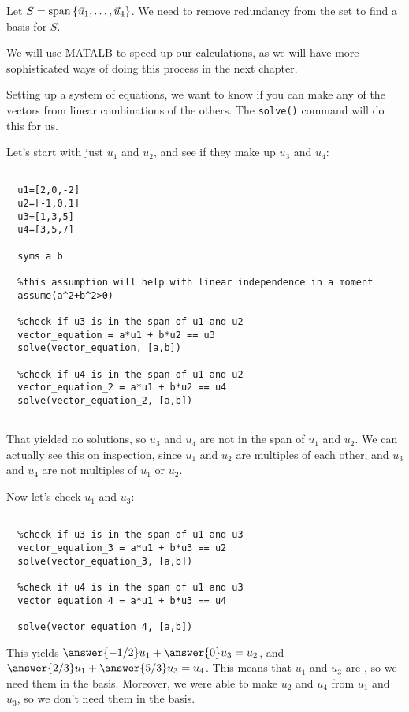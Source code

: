 \documentclass{ximera}
\begin{document}
\begin{solution}
  Let $S=\text{span}\left\{\vec{u}_1,\ldots,\vec{u}_4\right\}$. We need to remove redundancy from the set to find a basis for $S$.

  We will use MATALB to speed up our calculations, as we will have more sophisticated ways of doing this process in the next chapter.

  Setting up a system of equations, we want to know if you can make any of the vectors from linear combinations of the others. The \texttt{solve()} command will do this for us.

  Let's start with just $u_1$ and $u_2$, and see if they make up $u_3$ and $u_4$:

  \begin{verbatim}
  
  u1=[2,0,-2]
  u2=[-1,0,1]
  u3=[1,3,5]
  u4=[3,5,7]

  syms a b

  %this assumption will help with linear independence in a moment
  assume(a^2+b^2>0)

  %check if u3 is in the span of u1 and u2
  vector_equation = a*u1 + b*u2 == u3
  solve(vector_equation, [a,b])

  %check if u4 is in the span of u1 and u2
  vector_equation_2 = a*u1 + b*u2 == u4
  solve(vector_equation_2, [a,b])
  

  \end{verbatim}

  That yielded no solutions, so $u_3$ and $u_4$ are not in the span of $u_1$ and $u_2$. We can actually see this on inspection, since $u_1$ and $u_2$ are multiples of each other, and $u_3$ and $u_4$ are not multiples of $u_1$ or $u_2$.

  Now let's check $u_1$ and $u_3$:

  \begin{verbatim}

  %check if u3 is in the span of u1 and u3
  vector_equation_3 = a*u1 + b*u3 == u2
  solve(vector_equation_3, [a,b])

  %check if u4 is in the span of u1 and u3
  vector_equation_4 = a*u1 + b*u3 == u4

  solve(vector_equation_4, [a,b])

  \end{verbatim}

  This yields $\answer{-1/2} u_1 + \answer{0} u_3 = u_2$, and $\answer{2/3} u_1 + \answer{5/3} u_3 = u_4$. This means that $u_1$ and $u_3$ are , so we need them in the basis. Moreover, we were able to make $u_2$ and $u_4$ from $u_1$ and $u_3$, so we don't need them in the basis.


\end{solution}
\end{document}
